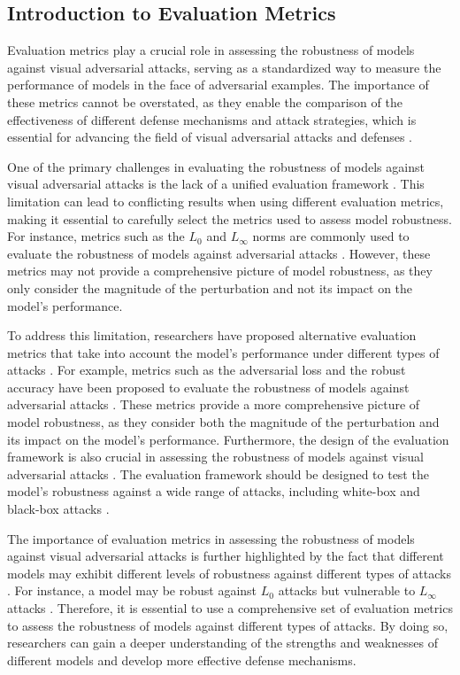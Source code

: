 \documentclass[11pt]{article}
\begin{document}
\subsection{Introduction to Evaluation Metrics}

Evaluation metrics play a crucial role in assessing the robustness of models against visual adversarial attacks, serving as a standardized way to measure the performance of models in the face of adversarial examples. The importance of these metrics cannot be overstated, as they enable the comparison of the effectiveness of different defense mechanisms and attack strategies, which is essential for advancing the field of visual adversarial attacks and defenses \cite{ref95}.

One of the primary challenges in evaluating the robustness of models against visual adversarial attacks is the lack of a unified evaluation framework \cite{ref161}. This limitation can lead to conflicting results when using different evaluation metrics, making it essential to carefully select the metrics used to assess model robustness. For instance, metrics such as the \(L_0\) and \(L_\infty\) norms are commonly used to evaluate the robustness of models against adversarial attacks \cite{ref161}. However, these metrics may not provide a comprehensive picture of model robustness, as they only consider the magnitude of the perturbation and not its impact on the model's performance.

To address this limitation, researchers have proposed alternative evaluation metrics that take into account the model's performance under different types of attacks \cite{ref162}. For example, metrics such as the adversarial loss and the robust accuracy have been proposed to evaluate the robustness of models against adversarial attacks \cite{ref163}. These metrics provide a more comprehensive picture of model robustness, as they consider both the magnitude of the perturbation and its impact on the model's performance. Furthermore, the design of the evaluation framework is also crucial in assessing the robustness of models against visual adversarial attacks \cite{ref164}. The evaluation framework should be designed to test the model's robustness against a wide range of attacks, including white-box and black-box attacks \cite{ref165}.

The importance of evaluation metrics in assessing the robustness of models against visual adversarial attacks is further highlighted by the fact that different models may exhibit different levels of robustness against different types of attacks \cite{ref166}. For instance, a model may be robust against \(L_0\) attacks but vulnerable to \(L_\infty\) attacks \cite{ref161}. Therefore, it is essential to use a comprehensive set of evaluation metrics to assess the robustness of models against different types of attacks. By doing so, researchers can gain a deeper understanding of the strengths and weaknesses of different models and develop more effective defense mechanisms.
\end{document}
